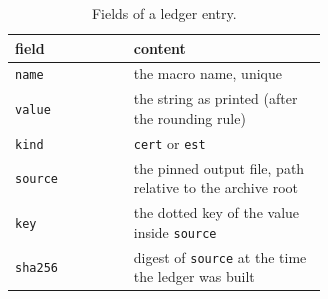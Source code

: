 \begin{table}[ht]
\centering\small
\begin{tabular}{@{}lp{0.62\linewidth}@{}}\toprule
field & content\\\midrule
\texttt{name} & the macro name, unique\\
\texttt{value} & the string as printed (after the rounding rule)\\
\texttt{kind} & \texttt{cert} or \texttt{est}\\
\texttt{source} & the pinned output file, path relative to the archive root\\
\texttt{key} & the dotted key of the value inside \texttt{source}\\
\texttt{sha256} & digest of \texttt{source} at the time the ledger was built\\
\bottomrule\end{tabular}
\caption{Fields of a ledger entry.}\label{pA:tab-ledger}
\end{table}

